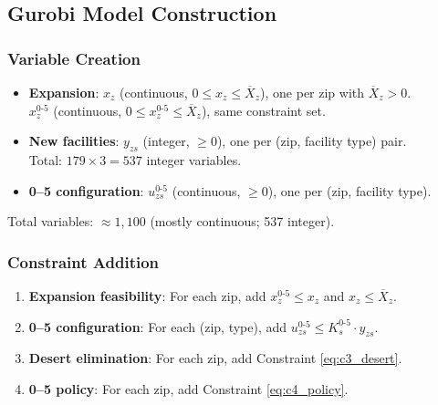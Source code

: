 \documentclass[12pt]{article}
\begin{document}
\subsection{Gurobi Model Construction}

\subsubsection{Variable Creation}

\begin{itemize}
    \item \textbf{Expansion}: $x_z$ (continuous, $0 \leq x_z \leq \overline{X}_z$), one per zip with $\overline{X}_z > 0$.
    \\ $x_z^{0\text{-}5}$ (continuous, $0 \leq x_z^{0\text{-}5} \leq \overline{X}_z$), same constraint set.
    
    \item \textbf{New facilities}: $y_{zs}$ (integer, $\geq 0$), one per (zip, facility type) pair.
    \\ Total: $179 \times 3 = 537$ integer variables.
    
    \item \textbf{0--5 configuration}: $u_{zs}^{0\text{-}5}$ (continuous, $\geq 0$), one per (zip, facility type).
\end{itemize}

\noindent
Total variables: $\approx 1{,}100$ (mostly continuous; 537 integer).

\subsubsection{Constraint Addition}

\begin{enumerate}
    \item \textbf{Expansion feasibility}: For each zip, add $x_z^{0\text{-}5} \leq x_z$ and $x_z \leq \overline{X}_z$.
    
    \item \textbf{0--5 configuration}: For each (zip, type), add $u_{zs}^{0\text{-}5} \leq K_s^{0\text{-}5} \cdot y_{zs}$.
    
    \item \textbf{Desert elimination}: For each zip, add Constraint \eqref{eq:c3_desert}.
    
    \item \textbf{0--5 policy}: For each zip, add Constraint \eqref{eq:c4_policy}.
\end{enumerate}
\end{document}
